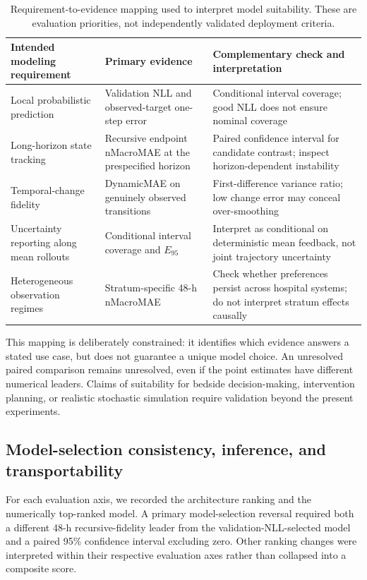 \documentclass[preprint,12pt]{elsarticle}
\begin{document}
\begin{table}[ht]
\centering
\caption{Requirement-to-evidence mapping used to interpret model suitability. These are evaluation priorities, not independently validated deployment criteria.}
\label{tab:decision_mapping}
\small
\begin{tabularx}{\textwidth}{p{2.75cm}p{3.0cm}X}
\toprule
Intended modeling requirement & Primary evidence & Complementary check and interpretation \\
\midrule
Local probabilistic prediction & Validation NLL and observed-target one-step error & Conditional interval coverage; good NLL does not ensure nominal coverage \\
Long-horizon state tracking & Recursive endpoint nMacroMAE at the prespecified horizon & Paired confidence interval for candidate contrast; inspect horizon-dependent instability \\
Temporal-change fidelity & DynamicMAE on genuinely observed transitions & First-difference variance ratio; low change error may conceal over-smoothing \\
Uncertainty reporting along mean rollouts & Conditional interval coverage and $E_{95}$ & Interpret as conditional on deterministic mean feedback, not joint trajectory uncertainty \\
Heterogeneous observation regimes & Stratum-specific 48-h nMacroMAE & Check whether preferences persist across hospital systems; do not interpret stratum effects causally \\
\bottomrule
\end{tabularx}
\end{table}

This mapping is deliberately constrained: it identifies which evidence answers a stated use case, but does not guarantee a unique model choice. An unresolved paired comparison remains unresolved, even if the point estimates have different numerical leaders. Claims of suitability for bedside decision-making, intervention planning, or realistic stochastic simulation require validation beyond the present experiments.

\subsection{Model-selection consistency, inference, and transportability}

For each evaluation axis, we recorded the architecture ranking and the
numerically top-ranked model. A primary model-selection reversal
required both a different 48-h recursive-fidelity leader from the
validation-NLL-selected model and a paired 95\% confidence interval
excluding zero. Other ranking changes were interpreted within their
respective evaluation axes rather than collapsed into a composite
score.
\end{document}
